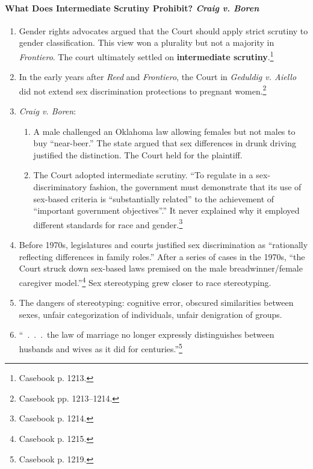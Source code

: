 \paragraph{What Does Intermediate Scrutiny Prohibit? \emph{Craig v. Boren}}

\begin{enumerate}
    \item Gender rights advocates argued that the Court should apply strict 
    scrutiny to gender classification. This view won a plurality but not a 
    majority in \emph{Frontiero}. The court ultimately settled on 
    \textbf{intermediate scrutiny}.\footnote{Casebook p. 1213.}
    \item In the early years after \emph{Reed} and \emph{Frontiero}, the Court 
    in \emph{Geduldig v. Aiello} did not extend sex discrimination protections 
    to pregnant women.\footnote{Casebook pp. 1213--1214.}
    \item \emph{Craig v. Boren}:
    \begin{enumerate}
        \item A male challenged an Oklahoma law allowing females but not males 
        to buy ``near-beer.'' The state argued that sex differences in drunk 
        driving justified the distinction. The Court held for the plaintiff. 
        \item The Court adopted intermediate scrutiny. ``To regulate in a 
        sex-discriminatory fashion, the government must demonstrate that its 
        use of sex-based criteria is \enquote{substantially related} to the 
        achievement of \enquote{important government objectives}.'' It never 
        explained why it employed different standards for race and 
        gender.\footnote{Casebook p. 1214.}
    \end{enumerate}
    \item Before 1970s, legislatures and courts justified sex discrimination 
    as ``rationally reflecting differences in family roles.'' After a series 
    of cases in the 1970s, ``the Court struck down sex-based laws premised on 
    the male breadwinner/female caregiver model.''\footnote{Casebook p. 1215.} 
    Sex stereotyping grew closer to race stereotyping.
    \item The dangers of stereotyping: cognitive error, obscured similarities 
    between sexes, unfair categorization of individuals, unfair denigration of 
    groups.
    \item ``~.~.~.~the law of marriage no longer expressly distinguishes 
    between husbands and wives as it did for centuries.''\footnote{Casebook p. 
    1219.}
\end{enumerate}

